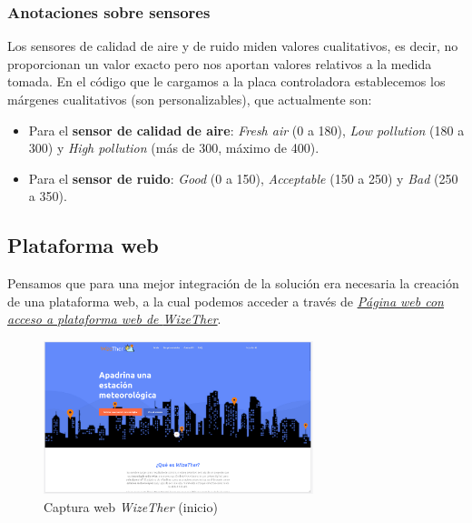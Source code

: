 \documentclass[12pt]{article}
\begin{document}
\subsubsection{Anotaciones sobre sensores}

Los sensores de calidad de aire y de ruido miden valores cualitativos, es decir, no proporcionan un valor exacto pero nos aportan valores relativos a la medida tomada. En el código que le cargamos a la placa controladora establecemos los márgenes cualitativos (son personalizables), que actualmente son:

\begin{itemize}
	\item Para el \textbf{sensor de calidad de aire}: \textit{Fresh air} (0 a 180), \textit{Low pollution} (180 a 300) y \textit{High pollution} (más de 300, máximo de 400).
	\item Para el \textbf{sensor de ruido}: \textit{Good} (0 a 150),  \textit{Acceptable} (150 a 250) y \textit{Bad} (250 a 350).
\end{itemize}

\pagebreak

\subsection{Plataforma web}
Pensamos que para una mejor integración de la solución era necesaria la creación de una plataforma web, a la cual podemos acceder a través de \href{https://wizether.ranii.pro/}{\textit{Página web con acceso a plataforma web de \textit{WizeTher}}}. \\

\begin{figure}[h]
	\begin{center}
		\includegraphics[width=0.7\textwidth]{img_rani/web_home.png}
		\caption{Captura web \textit{WizeTher} (inicio)}
	\end{center}
\end{figure}
\end{document}
